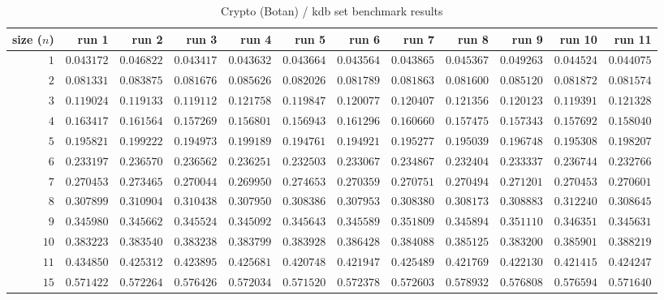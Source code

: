  
\begin{sidewaystable} \centering \caption{Crypto (Botan) / kdb set benchmark results} \label{eval-table-botan-set} \scriptsize \begin{tabular}{r|rrrrrrrrrrr} size ($n$) & run 1 & run 2 & run 3 & run 4 & run 5 & run 6 & run 7 & run 8 & run 9 & run 10 & run 11\\ \hline
$1$ & $0.043172$ & $0.046822$ & $0.043417$ & $0.043632$ & $0.043664$ & $0.043564$ & $0.043865$ & $0.045367$ & $0.049263$ & $0.044524$ & $0.044075$ \\
$2$ & $0.081331$ & $0.083875$ & $0.081676$ & $0.085626$ & $0.082026$ & $0.081789$ & $0.081863$ & $0.081600$ & $0.085120$ & $0.081872$ & $0.081574$ \\
$3$ & $0.119024$ & $0.119133$ & $0.119112$ & $0.121758$ & $0.119847$ & $0.120077$ & $0.120407$ & $0.121356$ & $0.120123$ & $0.119391$ & $0.121328$ \\
$4$ & $0.163417$ & $0.161564$ & $0.157269$ & $0.156801$ & $0.156943$ & $0.161296$ & $0.160660$ & $0.157475$ & $0.157343$ & $0.157692$ & $0.158040$ \\
$5$ & $0.195821$ & $0.199222$ & $0.194973$ & $0.199189$ & $0.194761$ & $0.194921$ & $0.195277$ & $0.195039$ & $0.196748$ & $0.195308$ & $0.198207$ \\
$6$ & $0.233197$ & $0.236570$ & $0.236562$ & $0.236251$ & $0.232503$ & $0.233067$ & $0.234867$ & $0.232404$ & $0.233337$ & $0.236744$ & $0.232766$ \\
$7$ & $0.270453$ & $0.273465$ & $0.270044$ & $0.269950$ & $0.274653$ & $0.270359$ & $0.270751$ & $0.270494$ & $0.271201$ & $0.270453$ & $0.270601$ \\
$8$ & $0.307899$ & $0.310904$ & $0.310438$ & $0.307950$ & $0.308386$ & $0.307953$ & $0.308380$ & $0.308173$ & $0.308883$ & $0.312240$ & $0.308645$ \\
$9$ & $0.345980$ & $0.345662$ & $0.345524$ & $0.345092$ & $0.345643$ & $0.345589$ & $0.351809$ & $0.345894$ & $0.351110$ & $0.346351$ & $0.345631$ \\
$10$ & $0.383223$ & $0.383540$ & $0.383238$ & $0.383799$ & $0.383928$ & $0.386428$ & $0.384088$ & $0.385125$ & $0.383200$ & $0.385901$ & $0.388219$ \\
$11$ & $0.434850$ & $0.425312$ & $0.423895$ & $0.425681$ & $0.420748$ & $0.421947$ & $0.425489$ & $0.421769$ & $0.422130$ & $0.421415$ & $0.424247$ \\
$15$ & $0.571422$ & $0.572264$ & $0.576426$ & $0.572034$ & $0.571520$ & $0.572378$ & $0.572603$ & $0.578932$ & $0.576808$ & $0.576594$ & $0.571640$ \\

\end{tabular}
\end{sidewaystable}
